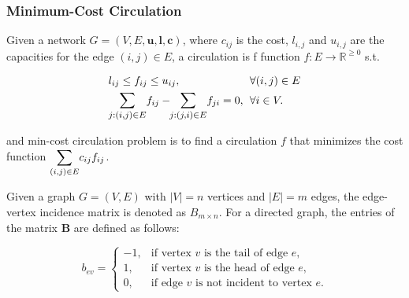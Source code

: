 \documentclass{article} %
\theoremstyle{bfnote}
\begin{document}
\subsubsection{Minimum-Cost Circulation}
Given a network $G=(V, E, \bm{u}, \bm{l}, \bm{c})$, where $c_{i j}$ is the cost, $l_{i, j}$ and $u_{i, j}$ are the capacities for the edge $(i,j)\in E$, a circulation is f function $f: E \rightarrow \mathbb{R}^{\geq 0}$ s.t.
\begin{equation}
	\arraycolsep=3pt
	\def\arraystretch{1.5}
	\begin{array}{ll}
		l_{i j} \leq f_{i j} \leq u_{i j}, & \forall(i, j) \in E \\
		\mathlarger{\mathlarger{\sum\limits_{j:(i, j) \in E}}} f_{i j} - \hspace{-3pt} \mathlarger{\mathlarger{\sum\limits_{j:(j, i) \in E}}} f_{j i} = 0, & \forall i \in V .
	\end{array}
	\label{eq:3}
\end{equation}


and min-cost circulation problem is to find a circulation $f$ that minimizes the cost function $\mathlarger{\sum_{(i, j) \in E}} c_{i j} f_{i j}$. 

Given a graph $ G = (V, E) $ with $ |V|=n $ vertices and $ |E|=m $ edges, the edge-vertex incidence matrix is denoted as $ B_{m \times n} $.
For a directed graph, the entries of the matrix $ \bm{B} $ are defined as follows:

\begin{equation}
	b_{e v} =
	\begin{cases}
		-1, & \text{if vertex } v \text{ is the tail of edge } e, \\
		1,  & \text{if vertex } v \text{ is the head of edge } e, \\
		0,  & \text{if edge } v \text{ is not incident to vertex } e.
	\end{cases}
	\label{eq:4}
\end{equation}

\end{document}
